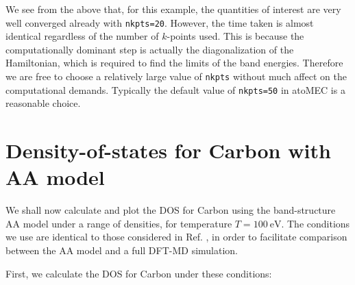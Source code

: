 \documentclass[11pt]{article}
\begin{document}
    We see from the above that, for this example, the quantities of interest
are very well converged already with \texttt{nkpts=20}. However, the
time taken is almost identical regardless of the number of \(k\)-points
used. This is because the computationally dominant step is actually the
diagonalization of the Hamiltonian, which is required to find the limits
of the band energies. Therefore we are free to choose a relatively large
value of \texttt{nkpts} without much affect on the computational
demands. Typically the default value of \texttt{nkpts=50} in atoMEC is a
reasonable choice.

    \hypertarget{density-of-states-for-carbon-with-aa-model}{%
\section{Density-of-states for Carbon with AA
model}\label{density-of-states-for-carbon-with-aa-model}}

We shall now calculate and plot the DOS for Carbon using the
band-structure AA model under a range of densities, for temperature
\(T=100\ \textrm{eV}\). The conditions we use are identical to those
considered in Ref. , in order to
facilitate comparison between the AA model and a full DFT-MD simulation.

First, we calculate the DOS for Carbon under these conditions:
\end{document}
